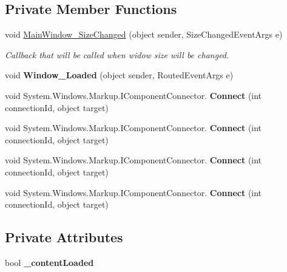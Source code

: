 \subsection*{Private Member Functions}
\begin{DoxyCompactItemize}
\item 
void \mbox{\hyperlink{class_teacher_handbook_1_1_main_window_a3465ff2f60cc2db4e53d699639e84173}{Main\+Window\+\_\+\+Size\+Changed}} (object sender, Size\+Changed\+Event\+Args e)
\begin{DoxyCompactList}\small\item\em Callback that will be called when widow size will be changed. \end{DoxyCompactList}\item 
\mbox{\label{class_teacher_handbook_1_1_main_window_aebb0343dedccc6a5031f02b8f758195a}} 
void {\bfseries Window\+\_\+\+Loaded} (object sender, Routed\+Event\+Args e)
\item 
\mbox{\label{class_teacher_handbook_1_1_main_window_a78d73a3313e3d2b787989f6f3ac0f987}} 
void System.\+Windows.\+Markup.\+I\+Component\+Connector. {\bfseries Connect} (int connection\+Id, object target)
\item 
\mbox{\label{class_teacher_handbook_1_1_main_window_a78d73a3313e3d2b787989f6f3ac0f987}} 
void System.\+Windows.\+Markup.\+I\+Component\+Connector. {\bfseries Connect} (int connection\+Id, object target)
\item 
\mbox{\label{class_teacher_handbook_1_1_main_window_a78d73a3313e3d2b787989f6f3ac0f987}} 
void System.\+Windows.\+Markup.\+I\+Component\+Connector. {\bfseries Connect} (int connection\+Id, object target)
\item 
\mbox{\label{class_teacher_handbook_1_1_main_window_a78d73a3313e3d2b787989f6f3ac0f987}} 
void System.\+Windows.\+Markup.\+I\+Component\+Connector. {\bfseries Connect} (int connection\+Id, object target)
\end{DoxyCompactItemize}
\subsection*{Private Attributes}
\begin{DoxyCompactItemize}
\item 
\mbox{\label{class_teacher_handbook_1_1_main_window_a13ad6f37e439449ae9cfbe3431dc66d2}} 
bool {\bfseries \+\_\+content\+Loaded}
\end{DoxyCompactItemize}


